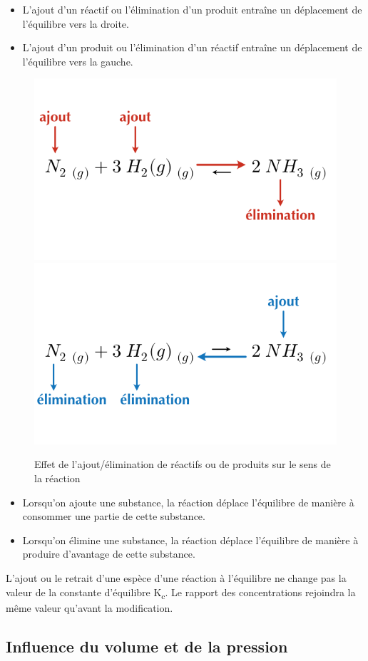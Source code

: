 \documentclass[
  11pt,
  a4paper,
  openany]{book}
\providecommand{\tightlist}{%
  \setlength{\itemsep}{0pt}\setlength{\parskip}{0pt}}
\begin{document}
\begin{itemize}
\tightlist
\item
  L'ajout d'un réactif ou l'élimination d'un produit entraîne un déplacement de l'équilibre vers la droite.
\item
  L'ajout d'un produit ou l'élimination d'un réactif entraîne un déplacement de l'équilibre vers la gauche.
\end{itemize}

\begin{figure}

{\centering \includegraphics[width=0.45\linewidth]{images/equilibres-concentrations-2a} \includegraphics[width=0.45\linewidth]{images/equilibres-concentrations-2b} 

}

\caption{Effet de l'ajout/élimination de réactifs ou de produits sur le sens de la réaction}\label{fig:equilibres-concentrations-2}
\end{figure}

\begin{itemize}
\tightlist
\item
  Lorsqu'on ajoute une substance, la réaction déplace l'équilibre de manière à consommer une partie de cette substance.
\item
  Lorsqu'on élimine une substance, la réaction déplace l'équilibre de manière à produire d'avantage de cette substance.
\end{itemize}

L'ajout ou le retrait d'une espèce d'une réaction à l'équilibre ne change pas la valeur de la constante d'équilibre K\textsubscript{c}. Le rapport des concentrations rejoindra la même valeur qu'avant la modification.

\subsection{Influence du volume et de la pression}\label{influence-du-volume-et-de-la-pression}
\end{document}
